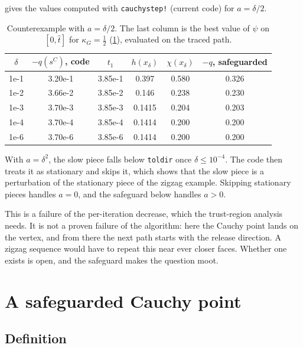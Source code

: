 \documentclass[11pt,a4paper]{article}
\numberwithin{equation}{section}
\theoremstyle{plain}
\theoremstyle{definition}
\theoremstyle{remark}
\newcommand{\kG}{\kappa_G}
\newcommand{\codeus}{\textunderscore\allowbreak}
\newcommand{\code}[1]{{\let\_\codeus\texttt{#1}}}
\begin{document}
 gives the values computed with \code{cauchy\_step!} (current code)
for $a=\delta/2$.

\begin{table}[ht]
\centering
\caption{Counterexample with $a=\delta/2$. The last column is the best value of $\psi$ on
$[0,\hat t]$ for $\kG=\frac12$ (\cref{sec:safeguard}), evaluated on the traced path.}
\label{tab:counterexample}
\begin{tabular}{cccccc}
\toprule
$\delta$ & $-q(s^C)$, code & $t_1$ & $h(x_\delta)$ & $\chi(x_\delta)$ & $-q$, safeguarded \\
\midrule
1e-1 & 3.20e-1 & 3.85e-1 & 0.397  & 0.580 & 0.326 \\
1e-2 & 3.66e-2 & 3.85e-2 & 0.146  & 0.238 & 0.230 \\
1e-3 & 3.70e-3 & 3.85e-3 & 0.1415 & 0.204 & 0.203 \\
1e-4 & 3.70e-4 & 3.85e-4 & 0.1414 & 0.200 & 0.200 \\
1e-6 & 3.70e-6 & 3.85e-6 & 0.1414 & 0.200 & 0.200 \\
\bottomrule
\end{tabular}
\end{table}

With $a=\delta^2$, the slow piece falls below \code{tol\_dir} once $\delta\le10^{-4}$. The code
then treats it as stationary and skips it, which shows that the slow piece is a perturbation of
the stationary piece of the zigzag example. Skipping stationary pieces handles $a=0$, and the
safeguard below handles $a>0$.

This is a failure of the per-iteration decrease, which the trust-region analysis needs. It is
not a proven failure of the algorithm: here the Cauchy point lands on the vertex, and from there
the next path starts with the release direction. A zigzag sequence would have to repeat this
near ever closer faces. Whether one exists is open, and the safeguard makes the question moot.

\section{A safeguarded Cauchy point}\label{sec:safeguard}

\subsection{Definition}\label{subsec:safeguard}
\end{document}
